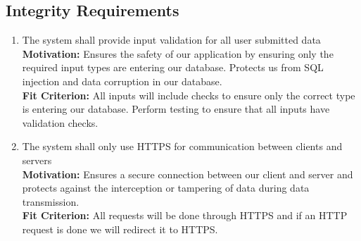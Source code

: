 \documentclass[12pt]{article}
\begin{document}
\subsection{Integrity Requirements}
\begin{enumerate}[align=left,
  leftmargin=*,
  labelsep=1em,
  itemindent=0em,
  label=\bfseries IG-\arabic*:,
  ref=\bfseries IG-\arabic*]
  \item \label{SIR1} The system shall provide input validation for all user submitted data \\[2mm]
    {\bf Motivation:} Ensures the safety of our application by ensuring only the required input types are entering our database. Protects us from SQL injection and data corruption in our database.  \\
    {\bf Fit Criterion:} All inputs will include checks to ensure only the correct type is entering our database. Perform testing to ensure that all inputs have validation checks.
  \item \label{SIR2} The system shall only use HTTPS for communication between clients and servers \\[2mm]
    {\bf Motivation:} Ensures a secure connection between our client and server and protects against the interception or tampering of data during data transmission. \\
    {\bf Fit Criterion:} All requests will be done through HTTPS and if an HTTP request is done we will redirect it to HTTPS. \\
\end{enumerate}
\end{document}
